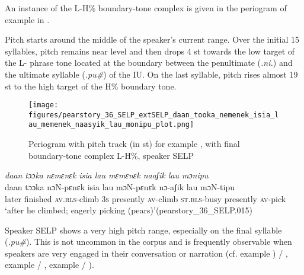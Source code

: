 
An instance of the L-H\% boundary-tone complex is given in the periogram   of example  in  . 

Pitch starts around the middle of the speaker's current range. Over the initial 15 syllables, pitch remains near level and then  drops 4 st   towards the low target of the L- phrase tone located at the boundary between the penultimate (\textit{.ni.}) and the ultimate syllable (\textit{.pu\#}) of the IU. On the last syllable, pitch rises almost 19 st to the high target of the H\% boundary tone.  

\begin{figure}
	\texttt{[image: figures/pearstory\_36\_SELP\_extSELP\_daan\_tooka\_nemenek\_isia\_lau\_memenek\_naasyik\_lau\_monipu\_plot.png]}
	\caption{Periogram with pitch track (in st) for example , with final boundary-tone complex L-H\%, speaker SELP}
	\label{pitch:daan tooka nemenek isia lau memenek naasyik lau monipu}
\end{figure}


\newpage
\ea
\label{ex:daan tooka nemenek isia lau memenek naasyik lau monipu}
\textit{daan tɔɔka nɛmɛnɛk isia lau mɛmɛnɛk naaʃik lau mɔnipu} \\
\gll daan tɔɔka nɔN-pɛnɛk isia lau mɔN-pɛnɛk nɔ-aʃik lau mɔN-tipu \\
later finished \textsc{av.rls}-climb 3\textsc{s} presently \textsc{av-}climb \textsc{st.rls}-busy presently \textsc{av}-pick\\
\glt `after he climbed; eagerly picking (pears)'\hfill(pearstory\_36\_SELP.015)
\z

Speaker SELP shows a very high pitch range, especially on the final syllable (\textit{.pu\#}). This is not uncommon in the corpus and is frequently observable when speakers are very engaged in their conversation or narration (cf. example ) /  , 
example  /
 ,
example  / ).



